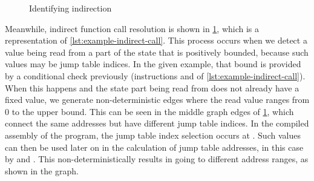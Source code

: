 \begin{figure}
  \centering
  \caption{Identifying indirection}\label{fig:example-indirect-call}
\end{figure}
Meanwhile, indirect function call resolution is shown in \cref{fig:example-indirect-call}, which is a representation of \cref{lst:example-indirect-call}.
This process occurs when we detect a value being read from a part of the state
that is positively bounded, because such values may be jump table indices.
In the given example, that bound is provided by a conditional check previously (instructions  and  of \cref{lst:example-indirect-call}).
When this happens and the state part being read from does not already have a fixed value, we generate non-deterministic edges where the read value ranges from 0 to the upper bound.
This can be seen in the middle graph edges of \cref{fig:example-indirect-call},
which connect the same addresses but have different jump table indices.
In the compiled assembly of the program, the jump table index selection occurs at .
Such values can then be used later on in the calculation of jump table addresses, in this case by  and .
This non-deterministically results in  going to different address ranges, as shown in the graph.


